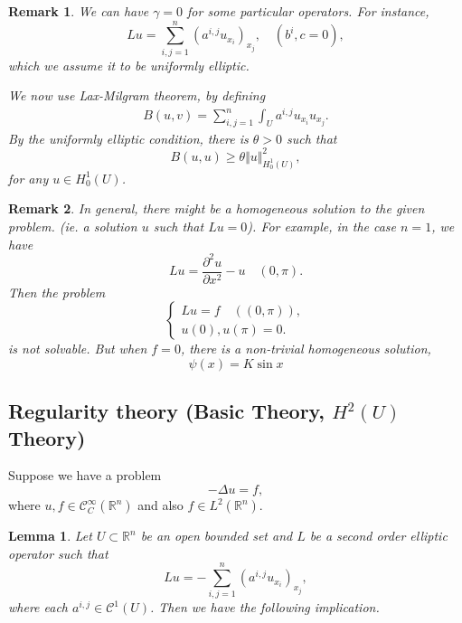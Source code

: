 \documentclass{article}
\newtheorem{lemma}{Lemma}[section]
\newtheorem{remark}{Remark}[section]
\numberwithin{equation}{section}
\begin{document}
\begin{remark}
We can have $\gamma=0$ for some particular operators. For instance, 
\begin{equation*}
Lu=\sum_{i,j=1}^n(a^{i,j}u_{x_i})_{x_j}, \quad (b^i,c=0),
\end{equation*}
which we assume it to be uniformly elliptic.\\
\par We now use Lax-Milgram theorem, by defining
\begin{align*}
B(u,v) = \sum_{i,j=1}^n \int_U a^{i,j}u_{x_i}u_{x_j}.
\end{align*}
By the uniformly elliptic condition, there is $\theta>0$ such that
\begin{equation*}
B(u,u)\geq \theta\Vert u \Vert^2_{H_0^1(U)},
\end{equation*}
for any $u\in H_0^1(U)$.
\end{remark}

\begin{remark}
In general, there might be a homogeneous solution to the given problem. (ie. a solution $u$ such that $Lu=0$). For example, in the case $n=1$, we have
\begin{equation*}
Lu = {\frac {\partial^2u} {\partial x^2}} - u \quad (0,\pi).
\end{equation*}
Then the problem
\begin{equation*}
\begin{cases}
Lu = f \quad ((0,\pi)),\\
u(0),u(\pi)=0.
\end{cases}
\end{equation*}
is not solvable. But when $f=0$, there is a non-trivial homogeneous solution,
\begin{equation*}
\psi(x) = K\sin x
\end{equation*} 
\end{remark}

\subsection{Regularity theory (Basic Theory, $H^2(U)$ Theory)}

Suppose we have a problem
\begin{equation*}
-\Delta u=f,
\end{equation*}
where $u,f\in \mathcal{C}^\infty_C(\mathbb{R}^n)$ and also $f\in L^2(\mathbb{R}^n)$. \\

\begin{lemma}
Let $U\subset\mathbb{R}^n$ be an open bounded set and $L$ be a second order elliptic operator such that
\begin{equation*}
Lu = -\sum_{i,j=1}^n (a^{i,j}u_{x_i})_{x_j},
\end{equation*}
where each $a^{i,j}\in \mathcal{C}^1(U)$. Then we have the following implication.
\begin{equation*}

\end{equation*}
\end{lemma}
\end{document}
